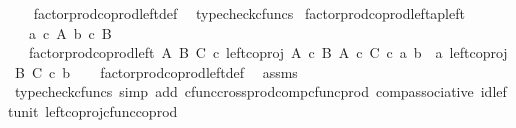 \begin{isabellebody}
%
\isadelimproof
\ \ %
\endisadelimproof
%
\isatagproof
{}\isamarkupfalse%
\ factor{\isacharunderscore}{\kern0pt}prod{\isacharunderscore}{\kern0pt}coprod{\isacharunderscore}{\kern0pt}left{\isacharunderscore}{\kern0pt}def\ \isamarkupfalse%
\ typecheck{\isacharunderscore}{\kern0pt}cfuncs%
\endisatagproof
{\isafoldproof}%
%
\isadelimproof
\isanewline
%
\endisadelimproof
\isanewline
{}\isamarkupfalse%
\ factor{\isacharunderscore}{\kern0pt}prod{\isacharunderscore}{\kern0pt}coprod{\isacharunderscore}{\kern0pt}left{\isacharunderscore}{\kern0pt}ap{\isacharunderscore}{\kern0pt}left{\isacharcolon}{\kern0pt}\isanewline
\ \ \ {\isachardoublequoteopen}a\ {\isasymin}\isactrlsub c\ A{\isachardoublequoteclose}\ {\isachardoublequoteopen}b\ {\isasymin}\isactrlsub c\ B{\isachardoublequoteclose}\isanewline
\ \ \ {\isachardoublequoteopen}factor{\isacharunderscore}{\kern0pt}prod{\isacharunderscore}{\kern0pt}coprod{\isacharunderscore}{\kern0pt}left\ A\ B\ C\ {\isasymcirc}\isactrlsub c\ left{\isacharunderscore}{\kern0pt}coproj\ {\isacharparenleft}{\kern0pt}A\ {\isasymtimes}\isactrlsub c\ B{\isacharparenright}{\kern0pt}\ {\isacharparenleft}{\kern0pt}A\ {\isasymtimes}\isactrlsub c\ C{\isacharparenright}{\kern0pt}\ {\isasymcirc}\isactrlsub c\ {\isasymlangle}a{\isacharcomma}{\kern0pt}\ b{\isasymrangle}\ {\isacharequal}{\kern0pt}\ {\isasymlangle}a{\isacharcomma}{\kern0pt}\ left{\isacharunderscore}{\kern0pt}coproj\ B\ C\ {\isasymcirc}\isactrlsub c\ b{\isasymrangle}{\isachardoublequoteclose}\isanewline
%
\isadelimproof
\ \ %
\endisadelimproof
%
\isatagproof
{}\isamarkupfalse%
\ factor{\isacharunderscore}{\kern0pt}prod{\isacharunderscore}{\kern0pt}coprod{\isacharunderscore}{\kern0pt}left{\isacharunderscore}{\kern0pt}def\ \isamarkupfalse%
\ assms\ \isanewline
\ \ \isamarkupfalse%
\ {\isacharparenleft}{\kern0pt}typecheck{\isacharunderscore}{\kern0pt}cfuncs{\isacharcomma}{\kern0pt}\ simp\ add{\isacharcolon}{\kern0pt}\ cfunc{\isacharunderscore}{\kern0pt}cross{\isacharunderscore}{\kern0pt}prod{\isacharunderscore}{\kern0pt}comp{\isacharunderscore}{\kern0pt}cfunc{\isacharunderscore}{\kern0pt}prod\ comp{\isacharunderscore}{\kern0pt}associative{}\ id{\isacharunderscore}{\kern0pt}left{\isacharunderscore}{\kern0pt}unit{}\ left{\isacharunderscore}{\kern0pt}coproj{\isacharunderscore}{\kern0pt}cfunc{\isacharunderscore}{\kern0pt}coprod{\isacharparenright}{\kern0pt}%
\endisatagproof
{\isafoldproof}%
%
\isadelimproof
\isanewline
%
\endisadelimproof

\end{isabellebody}
